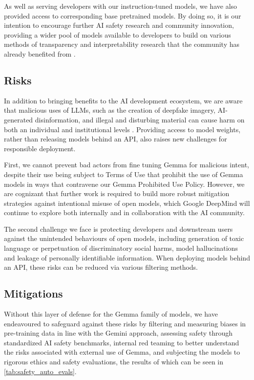 \documentclass[11pt, a4paper, logo, twocolumn, copyright, nonumbering]{googledeepmind}
\begin{document}
As well as serving developers with our instruction-tuned models, we have also provided access to corresponding base pretrained models. By doing so, it is our intention to encourage further AI safety research and community innovation, providing a wider pool of models available to developers to build on various methods of transparency and interpretability research that the community has already benefited from \citep{evans,hendrycks}.

\subsection{Risks}
In addition to bringing benefits to the AI development ecosystem, we are aware that malicious uses of LLMs, such as the creation of deepfake imagery, AI-generated disinformation, and illegal and disturbing material can cause harm on both an individual and institutional levels \citep{weidinger}. Providing access to model weights, rather than releasing models behind an API, also raises new challenges for responsible deployment. 

First, we cannot prevent bad actors from fine tuning Gemma for malicious intent, despite their use being subject to Terms of Use that prohibit the use of Gemma models in ways that contravene our Gemma Prohibited Use Policy. However, we are cognizant that further work is required to build more robust mitigation strategies against intentional misuse of open models, which Google DeepMind will continue to explore both internally and in collaboration with the AI community.

The second challenge we face is protecting developers and downstream users against the unintended behaviours of open models, including generation of toxic language or perpetuation of discriminatory social harms, model hallucinations and leakage of personally identifiable information. When deploying models behind an API, these risks can be reduced via various filtering methods.

\vspace{-2mm}
\subsection{Mitigations}

Without this layer of defense for the Gemma family of models, we have endeavoured to safeguard against these risks by filtering and measuring biases in pre-training data in line with the Gemini approach, assessing safety through standardized AI safety benchmarks, internal red teaming to better understand the risks associated with external use of Gemma, and subjecting the models to rigorous ethics and safety evaluations, the results of which can be seen in \ref{tab:safety_auto_evals}.
\end{document}
